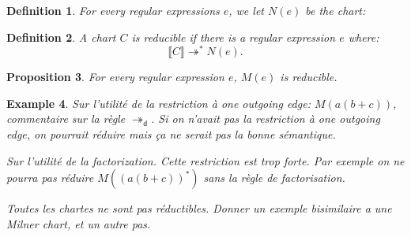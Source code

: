 \documentclass{article}
\newtheorem{definition}{Definition}[section]
\newtheorem{proposition}[definition]{Proposition}
\newtheorem{example}[definition]{Example}
\begin{document}
\begin{definition}
For every regular expressions $e$, we let ${N}(e)$ be the chart:
\begin{center}
    \end{center}
\end{definition}

\begin{definition}
    A chart $C$ is \emph{reducible} if there is a regular expression $e$ where:
     $$\llbracket C\rrbracket \twoheadrightarrow^* N(e).$$
\end{definition}


\begin{proposition} For every regular expression $e$, $M(e)$ is reducible.
    ~\label{prop:Milner-is-reducible}
\end{proposition}

\begin{example}
    Sur l'utilité de la restriction à one outgoing edge: $M(a(b+c))$, commentaire sur la règle $\twoheadrightarrow_{\mathsf{d}}$.
     Si on n'avait pas la restriction à one outgoing edge, on pourrait réduire mais ça ne serait pas 
     la bonne sémantique.

    Sur l'utilité de la factorization. Cette restriction est trop forte. Par exemple on ne pourra pas
    réduire $M((a(b+c))^*)$ sans la règle de factorisation.

    Toutes les chartes ne sont pas réductibles. Donner un exemple bisimilaire a une Milner chart, et un autre pas.
\end{example}



\end{document}
